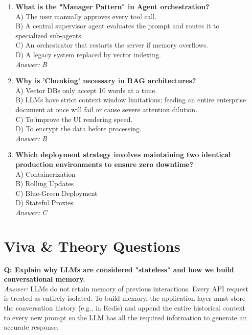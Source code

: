 \documentclass[12pt,a4paper,oneside]{book}
\begin{document}
\begin{enumerate}
    \item \textbf{What is the "Manager Pattern" in Agent orchestration?} \\
    A) The user manually approves every tool call. \\
    B) A central supervisor agent evaluates the prompt and routes it to specialized sub-agents. \\
    C) An orchestrator that restarts the server if memory overflows. \\
    D) A legacy system replaced by vector indexing. \\
    \textit{Answer: B}

    \item \textbf{Why is 'Chunking' necessary in RAG architectures?} \\
    A) Vector DBs only accept 10 words at a time. \\
    B) LLMs have strict context window limitations; feeding an entire enterprise document at once will fail or cause severe attention dilution. \\
    C) To improve the UI rendering speed. \\
    D) To encrypt the data before processing. \\
    \textit{Answer: B}

    \item \textbf{Which deployment strategy involves maintaining two identical production environments to ensure zero downtime?} \\
    A) Containerization \\
    B) Rolling Updates \\
    C) Blue-Green Deployment \\
    D) Stateful Proxies \\
    \textit{Answer: C}
\end{enumerate}

\section{Viva \& Theory Questions}

\textbf{Q: Explain why LLMs are considered "stateless" and how we build conversational memory.} \\
\textit{Answer:} LLMs do not retain memory of previous interactions. Every API request is treated as entirely isolated. To build memory, the application layer must store the conversation history (e.g., in Redis) and append the entire historical context to every new prompt so the LLM has all the required information to generate an accurate response.
\end{document}
